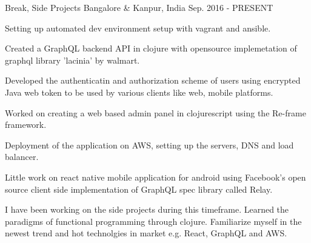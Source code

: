 

\begin{cventries}

  \cventry
    {} %
    {Break, Side Projects} %
    {Bangalore \& Kanpur, India} %
    {Sep. 2016 - PRESENT} %
    {
      \begin{cvitems} %
        \item {Setting up automated dev environment setup with vagrant and ansible.}
        \item {Created a GraphQL backend API in clojure with opensource implemetation of graphql library 'lacinia' by walmart.}
        \item {Developed the authenticatin and authorization scheme of users using encrypted Java web token to be used by various clients like web, mobile platforms.}
        \item {Worked on creating a web based admin panel in clojurescript using the Re-frame framework.}
        \item {Deployment of the application on AWS, setting up the servers, DNS and load balancer.}
        \item {Little work on react native mobile application for android using Facebook's open source client side implementation of GraphQL spec library called Relay.}
      \end{cvitems}
    }
    {
      \begin{cventrysummary}
        I have been working on the side projects during this timeframe. Learned the paradigms of functional programming through clojure. Familiarize myself in the newest trend and hot technolgies in market e.g. React, GraphQL and AWS.
      \end{cventrysummary}
    }


\end{cventries}
